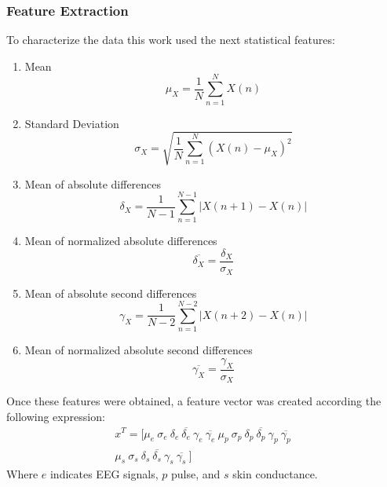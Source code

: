 \documentclass{sig-alternate}
\begin{document}
\subsubsection{Feature Extraction}

To characterize the data this work used the next statistical features:
\begin{enumerate}
\item Mean 
\begin{equation}
\mu_{X} = \frac{1}{N}\sum^{N}_{n=1} X(n)
\end{equation}
\item Standard Deviation 
\begin{equation}
\sigma_{X} = \sqrt{ \frac{1}{N}\sum^{N}_{n=1} (X(n)-\mu_{X})^{2} }
\end{equation}
\item Mean of absolute differences 
\begin{equation}
\delta_{X} = \frac{1}{N-1} \sum^{N-1}_{n=1}|X(n+1)-X(n)|
\end{equation}
\item Mean of normalized absolute differences
\begin{equation}
\overline{\delta_{X}} = \frac{\delta_{X}}{\sigma_{X}}
\end{equation}
\item Mean of absolute second differences  
\begin{equation}
\gamma_{X} = \frac{1}{N-2} \sum^{N-2}_{n=1}|X(n+2)-X(n)|
\end{equation}
\item Mean of normalized absolute second differences
\begin{equation}
\overline{\gamma_{X}} = \frac{\gamma_{X}}{\sigma_{X}}
\end{equation}
\end{enumerate}  

Once these features were obtained, a feature vector was created according the following 
expression:
\begin{equation}
\begin{split}
x^{T} = [\mu_{e}\ \sigma_{e}\ \delta_{e}\ \overline{\delta_{e}}\ \gamma_{e}\ \overline{\gamma_{e}}\ 
\mu_{p}\ \sigma_{p}\ \delta_{p}\ \overline{\delta_{p}}\ \gamma_{p}\ \overline{\gamma_{p}}\ \\
\mu_{s}\ \sigma_{s}\ \delta_{s}\ \overline{\delta_{s}}\ \gamma_{s}\ \overline{\gamma_{s}}\ ] 
\end{split}
\end{equation}
Where $e$ indicates EEG signals, $p$ pulse, and $s$ skin conductance.
\end{document}
